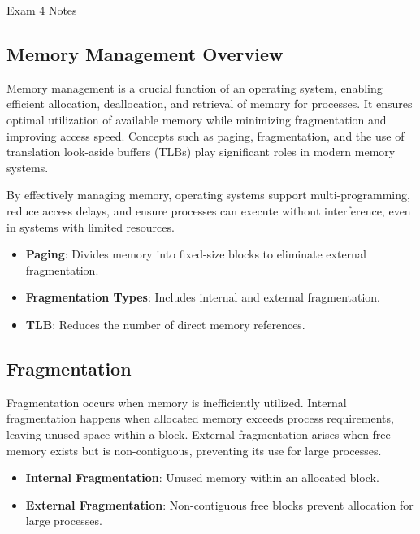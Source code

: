 \begin{examnotes}{Exam 4 Notes}
    \subsection*{Memory Management Overview}

    Memory management is a crucial function of an operating system, enabling efficient allocation, deallocation, and retrieval of memory for processes. It ensures optimal utilization of available 
    memory while minimizing fragmentation and improving access speed. Concepts such as paging, fragmentation, and the use of translation look-aside buffers (TLBs) play significant roles in modern 
    memory systems.
    
    By effectively managing memory, operating systems support multi-programming, reduce access delays, and ensure processes can execute without interference, even in systems with limited resources.
    
    \begin{highlight}
        \begin{itemize}
            \item \textbf{Paging}: Divides memory into fixed-size blocks to eliminate external fragmentation.
            \item \textbf{Fragmentation Types}: Includes internal and external fragmentation.
            \item \textbf{TLB}: Reduces the number of direct memory references.
        \end{itemize}
    \end{highlight}
    
    \subsection*{Fragmentation}
    
    Fragmentation occurs when memory is inefficiently utilized. Internal fragmentation happens when allocated memory exceeds process requirements, leaving unused space within a block. External 
    fragmentation arises when free memory exists but is non-contiguous, preventing its use for large processes.
    
    \begin{highlight}
        \begin{itemize}
            \item \textbf{Internal Fragmentation}: Unused memory within an allocated block.
            \item \textbf{External Fragmentation}: Non-contiguous free blocks prevent allocation for large processes.
        \end{itemize}
    \end{highlight}
    

\end{examnotes}
